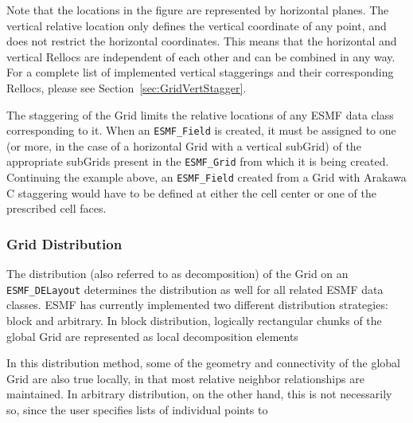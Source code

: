 Note that the locations in the figure are represented by horizontal planes.  The
vertical relative location only defines the vertical coordinate of any point, and
does not restrict the horizontal coordinates.  This means that the horizontal and
vertical Rellocs are independent of each other and can be combined in any way.
For a complete list of implemented vertical staggerings and their corresponding
Rellocs, please see Section~\ref{sec:GridVertStagger}.

The staggering of the Grid limits the relative locations of any ESMF data 
class corresponding to it.  When an {\tt ESMF\_Field} is created, it must be
assigned to one (or more, in the case of a horizontal Grid with a vertical
subGrid) of the appropriate subGrids present in the {\tt ESMF\_Grid} from
which it is being created.  Continuing the example above, an {\tt ESMF\_Field}
created from a Grid with Arakawa C staggering would have to be defined at either
the cell center or one of the prescribed cell faces. 


\subsubsection{Grid Distribution}

The distribution (also referred to as decomposition) of the Grid on an
{\tt ESMF\_DELayout} determines the distribution as well for all related
ESMF data classes.  ESMF has currently implemented two different distribution
strategies: block and arbitrary.  In block distribution, logically rectangular
chunks of the global Grid are represented as local decomposition elements


In this distribution method, some of the geometry and connectivity of the global
Grid are also true locally, in that most relative neighbor relationships are
maintained.  In arbitrary distribution, on the other hand, this is not
necessarily so, since the user specifies lists of individual points to

